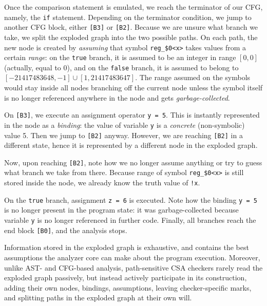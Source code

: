 \documentclass[a4paper,12pt]{article}
\begin{document}
Once the comparison statement is emulated, we reach the terminator of our CFG, namely, the \lstinline|if| statement. Depending on the terminator condition, we jump to another CFG block, either \lstinline|[B3]| or \lstinline|[B2]|. Because we are unsure what branch we take, we split the exploded graph into the two possible paths. On each path, the new node is created by \emph{assuming} that symbol \lstinline|reg_$0<x>| takes values from a certain \emph{range}: on the \lstinline|true| branch, it is assumed to be an integer in range $[0, 0]$ (actually, equal to $0$), and on the \lstinline|false| branch, it is assumed to belong to $[-21417483648, -1]\cup[1, 21417483647]$. The range assumed on the symbols would stay inside all nodes branching off the current node unless the symbol itself is no longer referenced anywhere in the node and gets \emph{garbage-collected}.

On \lstinline|[B3]|, we execute an assignment operator \lstinline|y = 5|. This is instantly represented in the node as a \emph{binding}: the value of variable \lstinline|y| is a \emph{concrete} (non-symbolic) value 5. Then we jump to \lstinline|[B2]| anyway. However, we are reaching \lstinline|[B2]| in a different state, hence it is represented by a different node in the exploded graph.

Now, upon reaching \lstinline|[B2]|, note how we no longer assume anything or try to guess what branch we take from there. Because range of symbol \lstinline|reg_$0<x>| is still stored inside the node, we already know the truth value of \lstinline|!x|. 

On the \lstinline|true| branch, assignment \lstinline|z = 6| is executed. Note how the binding \lstinline|y = 5| is no longer present in the program state: it was garbage-collected because variable \lstinline|y| is no longer referenced in further code. Finally, all branches reach the end block \lstinline|[B0]|, and the analysis stops.

Information stored in the exploded graph is exhaustive, and contains the best assumptions the analyzer core can make about the program execution. Moreover, unlike AST- and CFG-based analysis, path-sensitive CSA checkers rarely read the exploded graph passively, but instead actively participate in its construction, adding their own nodes, bindings, assumptions, leaving checker-specific marks, and splitting paths in the exploded graph at their own will.
\end{document}

